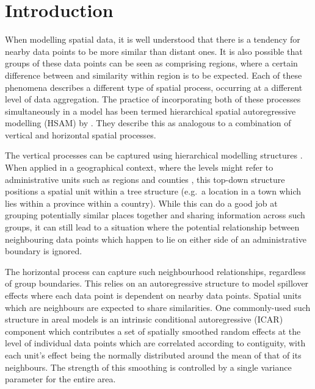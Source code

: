 \documentclass[webpdf,large,contemporary,namedate]{oup-authoring-template}
\theoremstyle{thmstyleone}
\theoremstyle{thmstyletwo}
\theoremstyle{thmstylethree}
\begin{document}


\maketitle


\section{Introduction}\label{introduction}

When modelling spatial data, it is well understood that there is a
tendency for nearby data points to be more similar than distant ones. It
is also possible that groups of these data points can be seen as
comprising regions, where a certain difference between and similarity
within region is to be expected. Each of these phenomena describes a
different type of spatial process, occurring at a different level of
data aggregation. The practice of incorporating both of these processes
simultaneously in a model has been termed hierarchical spatial
autoregressive modelling (HSAM) by \citet{dong2015}. They describe this
as analogous to a combination of vertical and horizontal spatial
processes.

The vertical processes can be captured using hierarchical modelling
structures \citep{goldstein1997}. When applied in a geographical
context, where the levels might refer to administrative units such as
regions and counties \citep{jones1991}, this top-down structure
positions a spatial unit within a tree structure (e.g.~a location in a
town which lies within a province within a country). While this can do a
good job at grouping potentially similar places together and sharing
information across such groups, it can still lead to a situation where
the potential relationship between neighbouring data points which happen
to lie on either side of an administrative boundary is ignored.

The horizontal process can capture such neighbourhood relationships,
regardless of group boundaries. This relies on an autoregressive
structure to model spillover effects where each data point is dependent
on nearby data points. Spatial units which are neighbours are expected
to share similarities. One commonly-used such structure in areal models
is an intrinsic conditional autoregressive (ICAR) component
\citep{besag1974} which contributes a set of spatially smoothed random
effects at the level of individual data points which are correlated
according to contiguity, with each unit's effect being the normally
distributed around the mean of that of its neighbours. The strength of
this smoothing is controlled by a single variance parameter for the
entire area.
\end{document}
